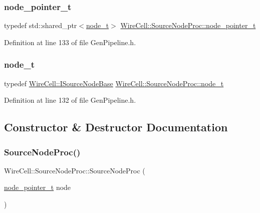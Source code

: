 \subsubsection{\texorpdfstring{node\+\_\+pointer\+\_\+t}{node\_pointer\_t}}
{\footnotesize\ttfamily typedef std\+::shared\+\_\+ptr$<$\hyperlink{class_wire_cell_1_1_source_node_proc_ae97fce28465567fec0df1469216df566}{node\+\_\+t}$>$ \hyperlink{class_wire_cell_1_1_source_node_proc_a66e3f8eee94e1a78f32cd32dcdab1c9a}{Wire\+Cell\+::\+Source\+Node\+Proc\+::node\+\_\+pointer\+\_\+t}}



Definition at line 133 of file Gen\+Pipeline.\+h.

\mbox{\label{class_wire_cell_1_1_source_node_proc_ae97fce28465567fec0df1469216df566}} 
\subsubsection{\texorpdfstring{node\+\_\+t}{node\_t}}
{\footnotesize\ttfamily typedef \hyperlink{class_wire_cell_1_1_i_source_node_base}{Wire\+Cell\+::\+I\+Source\+Node\+Base} \hyperlink{class_wire_cell_1_1_source_node_proc_ae97fce28465567fec0df1469216df566}{Wire\+Cell\+::\+Source\+Node\+Proc\+::node\+\_\+t}}



Definition at line 132 of file Gen\+Pipeline.\+h.



\subsection{Constructor \& Destructor Documentation}
\mbox{\label{class_wire_cell_1_1_source_node_proc_a628bcfe159927baa74396bc7b46ed421}} 
\subsubsection{\texorpdfstring{Source\+Node\+Proc()}{SourceNodeProc()}}
{\footnotesize\ttfamily Wire\+Cell\+::\+Source\+Node\+Proc\+::\+Source\+Node\+Proc (\begin{DoxyParamCaption}\item[{\hyperlink{class_wire_cell_1_1_source_node_proc_a66e3f8eee94e1a78f32cd32dcdab1c9a}{node\+\_\+pointer\+\_\+t}}]{node }\end{DoxyParamCaption})\hspace{0.3cm}{\ttfamily [inline]}}



